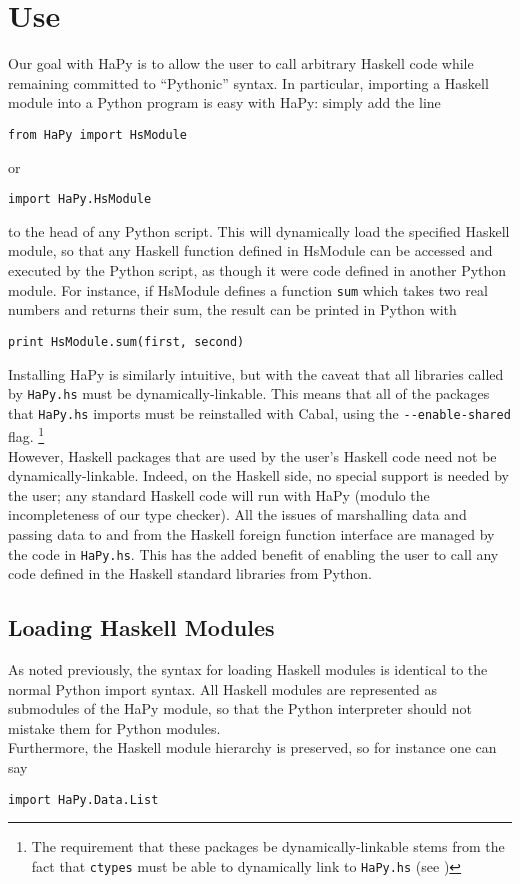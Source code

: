 \documentclass[11pt, letterpaper, oneside, twocolumn] {article}
\begin{document}
\section{Use}
Our goal with HaPy is to allow the user to call arbitrary Haskell code while remaining committed to ``Pythonic'' syntax. In particular, importing a Haskell module into a Python program is easy with HaPy: simply add the line
\begin{verbatim}
from HaPy import HsModule
\end{verbatim}
or
\begin{verbatim}
import HaPy.HsModule
\end{verbatim}
to the head of any Python script. This will dynamically load the specified Haskell module, so that any Haskell function defined in HsModule can be accessed and executed by the Python script, as though it were code defined in another Python module. For instance, if HsModule defines a function \verb!sum! which takes two real numbers and returns their sum, the result can be printed in Python with
\begin{verbatim}
print HsModule.sum(first, second)
\end{verbatim}
Installing HaPy is similarly intuitive, but with the caveat that all libraries called by \verb!HaPy.hs! must be dynamically-linkable. This means that all of the packages that \verb!HaPy.hs! imports must be reinstalled with Cabal, using the \verb!--enable-shared! flag. \footnote{The requirement that these packages be dynamically-linkable stems from the fact that \texttt{ctypes} must be able to dynamically link to \texttt{HaPy.hs} (see ) } \\
However, Haskell packages that are used by the user's Haskell code need not be dynamically-linkable. Indeed, on the Haskell side, no special support is needed by the user; any standard Haskell code will run with HaPy (modulo the incompleteness of our type checker). All the issues of marshalling data and passing data to and from the Haskell foreign function interface are managed by the code in \verb!HaPy.hs!. This has the added benefit of enabling the user to call any code defined in the Haskell standard libraries from Python. 

\subsection{Loading Haskell Modules}
As noted previously, the syntax for loading Haskell modules is identical to the normal Python import syntax. All Haskell modules are represented as submodules of the HaPy module, so that the Python interpreter should not mistake them for Python modules. \\
Furthermore, the Haskell module hierarchy is preserved, so for instance one can say
\begin{verbatim}
import HaPy.Data.List
\end{verbatim}
\end{document}
